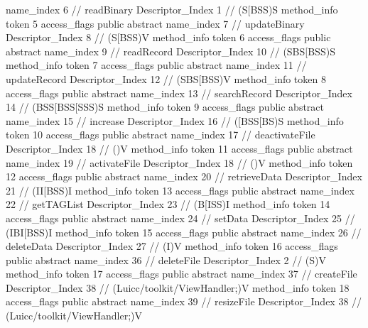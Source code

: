 {{{{{					name_index	6		// readBinary
					Descriptor_Index	1		// (S[BSS)S
				}
				method_info {
					token	5
					access_flags	public abstract
					name_index	7		// updateBinary
					Descriptor_Index	8		// (S[BSS)V
				}
				method_info {
					token	6
					access_flags	public abstract
					name_index	9		// readRecord
					Descriptor_Index	10		// (SBS[BSS)S
				}
				method_info {
					token	7
					access_flags	public abstract
					name_index	11		// updateRecord
					Descriptor_Index	12		// (SBS[BSS)V
				}
				method_info {
					token	8
					access_flags	public abstract
					name_index	13		// searchRecord
					Descriptor_Index	14		// (BSS[BSS[SSS)S
				}
				method_info {
					token	9
					access_flags	public abstract
					name_index	15		// increase
					Descriptor_Index	16		// ([BSS[BS)S
				}
				method_info {
					token	10
					access_flags	public abstract
					name_index	17		// deactivateFile
					Descriptor_Index	18		// ()V
				}
				method_info {
					token	11
					access_flags	public abstract
					name_index	19		// activateFile
					Descriptor_Index	18		// ()V
				}
				method_info {
					token	12
					access_flags	public abstract
					name_index	20		// retrieveData
					Descriptor_Index	21		// (II[BSS)I
				}
				method_info {
					token	13
					access_flags	public abstract
					name_index	22		// getTAGList
					Descriptor_Index	23		// (B[ISS)I
				}
				method_info {
					token	14
					access_flags	public abstract
					name_index	24		// setData
					Descriptor_Index	25		// (IBI[BSS)I
				}
				method_info {
					token	15
					access_flags	public abstract
					name_index	26		// deleteData
					Descriptor_Index	27		// (I)V
				}
				method_info {
					token	16
					access_flags	public abstract
					name_index	36		// deleteFile
					Descriptor_Index	2		// (S)V
				}
				method_info {
					token	17
					access_flags	public abstract
					name_index	37		// createFile
					Descriptor_Index	38		// (Luicc/toolkit/ViewHandler;)V
				}
				method_info {
					token	18
					access_flags	public abstract
					name_index	39		// resizeFile
					Descriptor_Index	38		// (Luicc/toolkit/ViewHandler;)V
				}
			}
		}
	}
}

